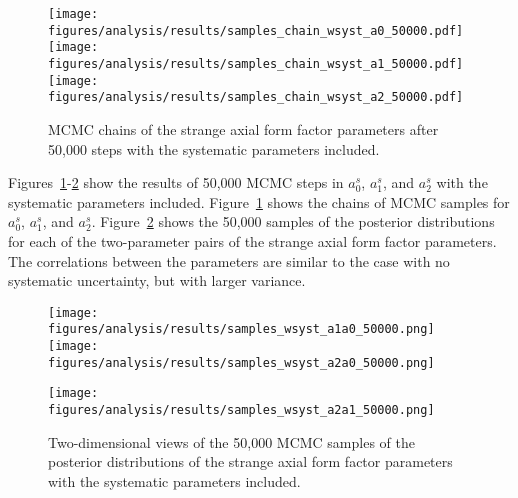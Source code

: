     \begin{figure}[h]
      \centering
      \texttt{[image: figures/analysis/results/samples\_chain\_wsyst\_a0\_50000.pdf]} \\
      \texttt{[image: figures/analysis/results/samples\_chain\_wsyst\_a1\_50000.pdf]} \\
      \texttt{[image: figures/analysis/results/samples\_chain\_wsyst\_a2\_50000.pdf]}
      \caption{MCMC chains of the strange axial form factor parameters after
      50,000 steps with the systematic parameters included.}
      \label{fig:chainws}
    \end{figure}
    Figures~\ref{fig:chainws}-\ref{fig:samplesws} show the results of 50,000
    MCMC steps in $a_0^s$, $a_1^s$, and $a_2^s$ with the systematic parameters
    included.  Figure~\ref{fig:chainws} shows the chains of MCMC samples for
    $a_0^s$, $a_1^s$, and $a_2^s$. Figure~\ref{fig:samplesws} shows the 50,000
    samples of the posterior distributions for each of the two-parameter pairs
    of the strange axial form factor parameters. The correlations between the
    parameters are similar to the case with no systematic uncertainty, but with
    larger variance.
    \begin{figure}[h]
      \texttt{[image: figures/analysis/results/samples\_wsyst\_a1a0\_50000.png]}
      \hspace{2pt}
      \texttt{[image: figures/analysis/results/samples\_wsyst\_a2a0\_50000.png]}
      \begin{flushright}
      \texttt{[image: figures/analysis/results/samples\_wsyst\_a2a1\_50000.png]}
      \end{flushright} 
      \caption{Two-dimensional views of the 50,000 MCMC samples of the
      posterior distributions of the strange axial form factor parameters with
      the systematic parameters included.}
      \label{fig:samplesws}
    \end{figure}

